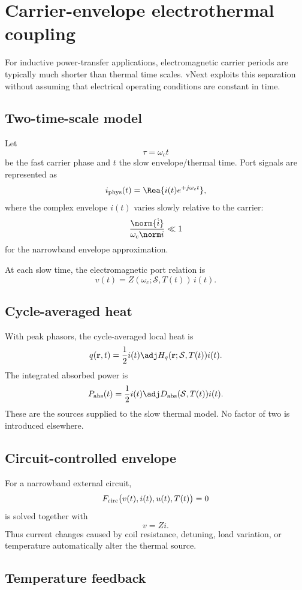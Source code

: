 \section{Carrier-envelope electrothermal coupling}
\label{sec:carrier-envelope}

For inductive power-transfer applications, electromagnetic carrier periods are
typically much shorter than thermal time scales. vNext exploits this separation
without assuming that electrical operating conditions are constant in time.

\subsection{Two-time-scale model}

Let
\[
  \tau=\omega_c t
\]
be the fast carrier phase and $t$ the slow envelope/thermal time. Port signals
are represented as
\[
  i_{\rm phys}(t)
  =
  \Rea\{i(t)e^{+j\omega_c t}\},
\]
where the complex envelope $i(t)$ varies slowly relative to the carrier:
\[
  \frac{\norm{\dot i}}{\omega_c\norm i}
  \ll1
\]
for the narrowband envelope approximation.

At each slow time, the electromagnetic port relation is
\[
  v(t)
  =
  Z(\omega_c;\mathcal S,T(t))\,i(t).
\]

\subsection{Cycle-averaged heat}

With peak phasors, the cycle-averaged local heat is
\[
 q(\mathbf r,t)
 =
 \frac12
 i(t)\adj H_q(\mathbf r;\mathcal S,T(t))i(t).
 \label{eq:cycle-heat}
\]
The integrated absorbed power is
\[
 P_{\rm abs}(t)
 =
 \frac12
 i(t)\adj D_{\rm abs}(\mathcal S,T(t))i(t).
\]
These are the sources supplied to the slow thermal model. No factor of two is
introduced elsewhere.

\subsection{Circuit-controlled envelope}

For a narrowband external circuit,
\[
  F_{\rm circ}
  \big(
    v(t),i(t),u(t),T(t)
  \big)=0
\]
is solved together with
\[
  v=Zi.
\]
Thus current changes caused by coil resistance, detuning, load variation, or
temperature automatically alter the thermal source.

\subsection{Temperature feedback}

